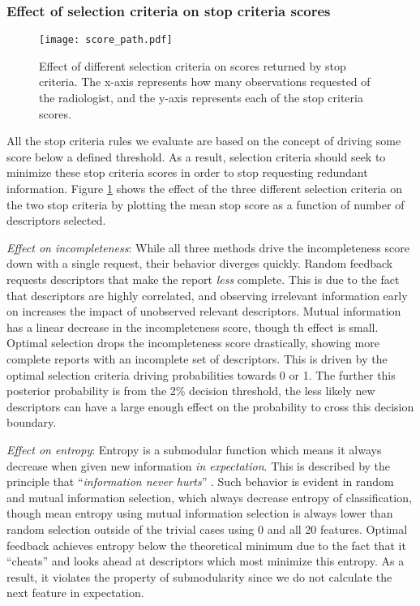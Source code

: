 \subsubsection{Effect of selection criteria on stop criteria scores}

\begin{figure}[h]
	\centering
	\texttt{[image: score\_path.pdf]}
	\caption[Effect of selection criteria on stop criteria scores]{Effect of different selection criteria on scores returned by stop criteria. The x-axis represents how many observations requested of the radiologist, and the y-axis represents each of the stop criteria scores.}
	\label{fig:feedback_score_path}
\end{figure} 

All the stop criteria rules we evaluate are based on the concept of driving some score below a defined threshold. As a result, selection criteria should seek to minimize these stop criteria scores in order to stop requesting redundant information. Figure \ref{fig:feedback_score_path} shows the effect of the three different selection criteria on the two stop criteria by plotting the mean stop score as a function of number of descriptors selected.

\emph{Effect on incompleteness}:
While all three methods drive the incompleteness score down with a single request, their behavior diverges quickly. Random feedback requests descriptors that make the report \emph{less} complete. This is due to the fact that descriptors are highly correlated, and observing irrelevant information early on increases the impact of unobserved relevant descriptors. Mutual information has a linear decrease in the incompleteness score, though th effect is small. Optimal selection drops the incompleteness score drastically, showing more complete reports with an incomplete set of descriptors. This is driven by the optimal selection criteria driving probabilities towards 0 or 1. The further this posterior probability is from the 2\% decision threshold, the less likely new descriptors can have a large enough effect on the probability to cross this decision boundary.

\emph{Effect on entropy}:
Entropy is a submodular function which means it always decrease when given new information \emph{in expectation}. This is described by the principle that ``\emph{information never hurts}'' \cite{Nemhauser:1978ck,Krause:2005tr}. Such behavior is evident in random and mutual information selection, which always decrease entropy of classification, though mean entropy using mutual information selection is always lower than random selection outside of the trivial cases using 0 and all 20 features. Optimal feedback achieves entropy below the theoretical minimum due to the fact that it ``cheats'' and looks ahead at descriptors which most minimize this entropy. As a result, it violates the property of submodularity since we do not calculate the next feature in expectation.


